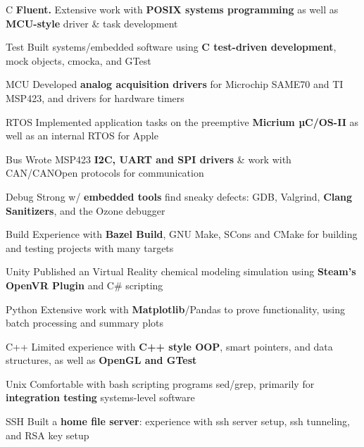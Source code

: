 \begin{cvskills}

 \cvskill
    {C} %
    {\textbf{Fluent.} Extensive work with \textbf{POSIX systems programming} as well as \textbf{MCU-style} driver \& task development}%

 \cvskill
    {Test} %
    {Built systems/embedded software using \textbf{C test-driven development}, mock objects, cmocka, and GTest} %

 \cvskill
    {MCU} %
    {Developed \textbf{analog acquisition drivers} for Microchip SAME70 and TI MSP423, and drivers for hardware timers} %

 \cvskill
    {RTOS} %
    {Implemented application tasks on the preemptive \textbf{Micrium µC/OS-II} as well as an internal RTOS for Apple  } %

 \cvskill
    {Bus} %
    {Wrote MSP423 \textbf{I2C, UART and SPI drivers} \& work with CAN/CANOpen protocols for communication}

 \cvskill
    {Debug} %
    {Strong w/ \textbf{embedded tools} find sneaky defects: GDB, Valgrind, \textbf{Clang Sanitizers}, and the Ozone debugger} %

 \cvskill
    {Build} %
    {Experience with \textbf{Bazel Build}, GNU Make, SCons and CMake for building and testing projects with many targets} %


 \cvskill
    {Unity} %
    {Published an Virtual Reality chemical modeling simulation using \textbf{Steam's OpenVR Plugin} and C\# scripting}

 \cvskill
    {Python} %
    {Extensive work with \textbf{Matplotlib}/Pandas to prove functionality, using batch processing and summary plots} 

 \cvskill
    {C++} %
    {Limited experience with \textbf{C++ style OOP}, smart pointers, and data structures, as well as \textbf{OpenGL and GTest}}%
    
 \cvskill
    {Unix} %
    {Comfortable with bash scripting programs sed/grep, primarily for \textbf{integration testing} systems-level software} %

 \cvskill
    {SSH} %
    {Built a \textbf{home file server}: experience with ssh server setup, ssh tunneling, and RSA key setup} %



\end{cvskills}
